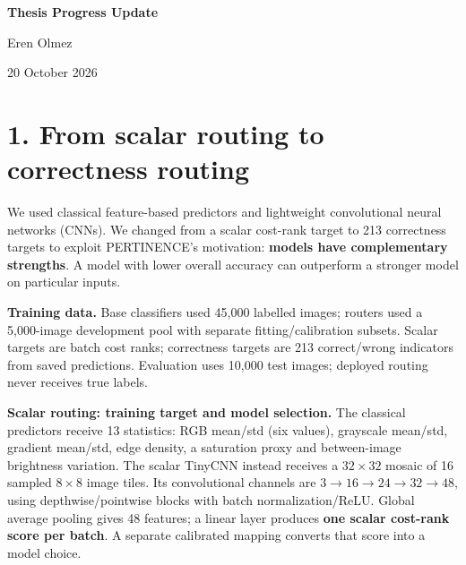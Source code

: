 \documentclass[10pt,a4paper]{article}
\begin{document}
\raggedbottom
\begin{center}
{\Large\bfseries Thesis Progress Update}\par
{Eren Olmez}\par
{20 October 2026}\par
\end{center}
\vspace{-0.6em}
\section*{1. From scalar routing to correctness routing}
We used classical feature-based predictors and lightweight convolutional neural networks (CNNs). We changed from a scalar cost-rank target to 213 correctness targets to exploit PERTINENCE's motivation: \textbf{models have complementary strengths}. A model with lower overall accuracy can outperform a stronger model on particular inputs.

\textbf{Training data.} Base classifiers used 45,000 labelled images; routers used a 5,000-image development pool with separate fitting/calibration subsets. Scalar targets are batch cost ranks; correctness targets are 213 correct/wrong indicators from saved predictions. Evaluation uses 10,000 test images; deployed routing never receives true labels.

\textbf{Scalar routing: training target and model selection.}
The classical predictors receive 13 statistics: RGB mean/std (six values), grayscale mean/std, gradient mean/std, edge density, a saturation proxy and between-image brightness variation. The scalar TinyCNN instead receives a $32\times32$ mosaic of 16 sampled $8\times8$ image tiles. Its convolutional channels are $3\to16\to24\to32\to48$, using depthwise/pointwise blocks with batch normalization/ReLU. Global average pooling gives 48 features; a linear layer produces \textbf{one scalar cost-rank score per batch}. A separate calibrated mapping converts that score into a model choice.
\end{document}
